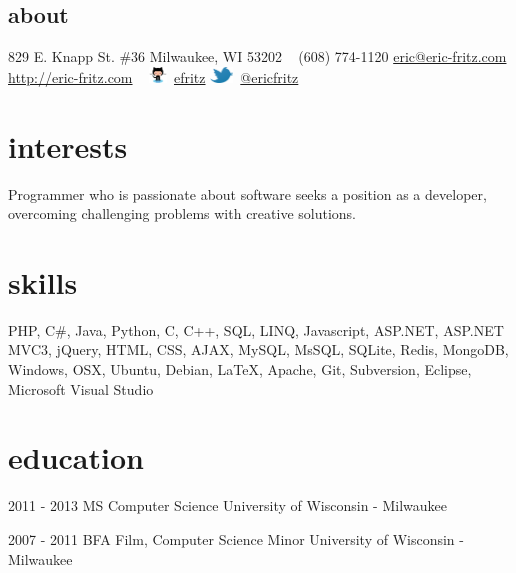 \documentclass[]{fritz-resume}
\begin{document}


\begin{aside}
	\section{about}
		829 E. Knapp St. \#36
		Milwaukee, WI 53202
		~
		(608) 774-1120
		\href{mailto:eric@eric-fritz.com?subject=resume}{eric@eric-fritz.com}
		\href{http://eric-fritz.com}{http://eric-fritz.com}
		~
		\includegraphics[height=12pt]{github.eps}~\href{http://github.com/efritz}{efritz}
		\includegraphics[height=12pt]{twitter.eps}~\href{http://twitter.com/ericfritz}{@ericfritz}
\end{aside}


\section{interests}

{\small Programmer who is passionate about software seeks a position as a developer, overcoming challenging problems with creative solutions.}


\section{skills}

{\small PHP, C\#, Java, Python, C, C++, SQL, LINQ, Javascript, ASP.NET, ASP.NET MVC3, jQuery, HTML, CSS, AJAX, MySQL, MsSQL, SQLite, Redis, MongoDB, Windows, OSX, Ubuntu, Debian, \LaTeX{}, Apache, Git, Subversion, Eclipse, Microsoft Visual Studio}


\section{education}

\begin{entrylist}
	\entry
		{2011 - 2013}
		{MS Computer Science}
		{University of Wisconsin - Milwaukee}
		{
			 \\
		}
	
	\entry
		{2007 - 2011}
		{BFA Film, Computer Science Minor}
		{University of Wisconsin - Milwaukee}
		{
			 \\
		}
\end{entrylist}
\end{document}
